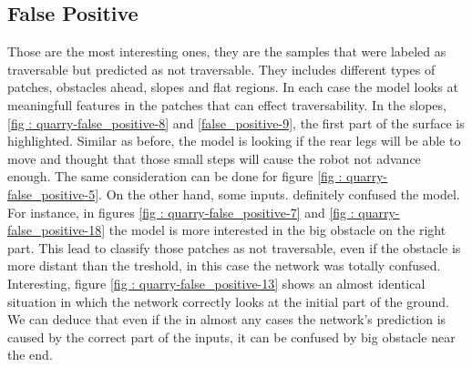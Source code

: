 \documentclass[../document.tex]{subfiles}
\begin{document}
\subsection{False Positive}
Those are the most interesting ones, they are the samples that were labeled as traversable but predicted as not traversable. They includes different types of patches, obstacles ahead, slopes and flat regions. In each case the model looks at meaningfull features in the patches that can effect traversability. In the slopes, \ref{fig : quarry-false_positive-8} and \ref{false_positive-9}, the first part of the surface is highlighted. Similar as before, the model is looking if the rear legs will be able to move and thought that those small steps will cause the robot not advance enough. The same consideration can be done for figure \ref{fig : quarry-false_positive-5}. On the other hand, some inputs. definitely confused the model. For instance, in figures \ref{fig : quarry-false_positive-7} and \ref{fig : quarry-false_positive-18} the model is more interested in the big obstacle on the right part. This lead to classify those patches as not traversable, even if the obstacle is more distant than the treshold, in this case the network was totally confused. Interesting, figure \ref{fig : quarry-false_positive-13} shows an almost identical situation in which the network correctly looks at the initial part of the ground. We can deduce that even if the in almost any cases the network's prediction is caused by the correct part of the inputs, it can be confused by big obstacle near the end.
\end{document}
